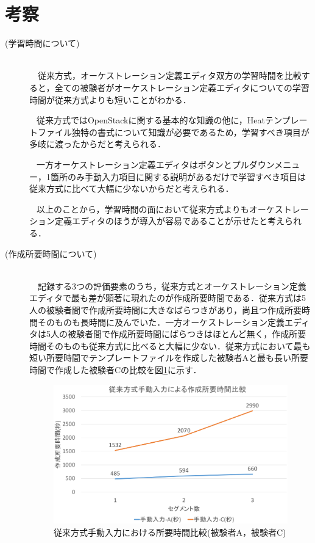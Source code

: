\documentclass[mingoth]{kut-paper}		%
\begin{document}
	\section{考察}
	\begin{description}
		\item[(学習時間について)]\mbox{}\\ 　従来方式，オーケストレーション定義エディタ双方の学習時間を比較すると，全ての被験者がオーケストレーション定義エディタについての学習時間が従来方式よりも短いことがわかる．
		
		\texttt　従来方式ではOpenStackに関する基本的な知識の他に，Heatテンプレートファイル独特の書式について知識が必要であるため，学習すべき項目が多岐に渡ったからだと考えられる．
		
		\texttt 　一方オーケストレーション定義エディタはボタンとプルダウンメニュー，1箇所のみ手動入力項目に関する説明があるだけで学習すべき項目は従来方式に比べて大幅に少ないからだと考えられる．
		
		\texttt 　以上のことから，学習時間の面において従来方式よりもオーケストレーション定義エディタのほうが導入が容易であることが示せたと考えられる．
		
		\item[(作成所要時間について)]\mbox{}\\ 　記録する3つの評価要素のうち，従来方式とオーケストレーション定義エディタで最も差が顕著に現れたのが作成所要時間である．従来方式は5人の被験者間で作成所要時間に大きなばらつきがあり，尚且つ作成所要時間そのものも長時間に及んでいた．一方オーケストレーション定義エディタは5人の被験者間で作成所要時間にばらつきはほとんど無く，作成所要時間そのものも従来方式に比べると大幅に少ない．従来方式において最も短い所要時間でテンプレートファイルを作成した被験者Aと最も長い所要時間で作成した被験者Cの比較を図\ref{graf:4}に示す．
		
		\begin{figure}[H]
			\begin{center}
				\includegraphics[scale=0.45]{Document/ManualComparisonAC.eps}
				\caption{従来方式手動入力における所要時間比較(被験者A，被験者C)}
				\label{graf:4}
			\end{center}
		\end{figure}
		

\end{description}
\end{document}
